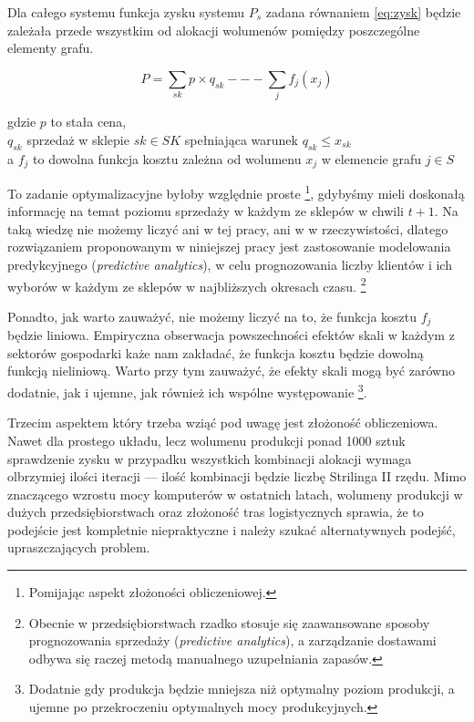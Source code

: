 \documentclass[polish, twoside, 12pt, a4paper]{article}
\theoremstyle{definition}
\theoremstyle{plain}
\theoremstyle{remark}
\begin{document}
Dla całego systemu funkcja zysku systemu $P_s$ zadana równaniem \ref{eq:zysk} będzie zależała przede wszystkim od alokacji wolumenów pomiędzy poszczególne elementy grafu.

\begin{equation} \label{eq:zysk}
P = \sum\limits_{sk} p \times q_{sk} --- \sum\limits_{j} f_j(x_j)
\end{equation}

\begin{center} gdzie $p$ to stała cena, \\ $q_{sk}$  sprzedaż w sklepie $sk \in SK$ spełniająca warunek $q_{sk} \le x_{sk}$ \\ a $f_j$ to dowolna funkcja kosztu zależna od wolumenu $x_j$ w elemencie grafu $j \in S$ \end{center}

To zadanie optymalizacyjne byłoby względnie proste \footnote{Pomijając aspekt złożoności obliczeniowej.}, gdybyśmy mieli doskonałą informację na temat poziomu sprzedaży w każdym ze sklepów w chwili $ t + 1 $. Na taką wiedzę nie możemy liczyć ani w tej pracy, ani w w rzeczywistości, dlatego rozwiązaniem proponowanym w niniejszej pracy jest zastosowanie modelowania predykcyjnego (\textit{predictive analytics}), w celu prognozowania liczby klientów i ich wyborów w każdym ze sklepów w najbliższych okresach czasu. \footnote{Obecnie w przedsiębiorstwach rzadko stosuje się zaawansowane sposoby prognozowania sprzedaży (\textit{predictive analytics}), a zarządzanie dostawami odbywa się raczej metodą manualnego uzupełniania zapasów.} 

Ponadto, jak warto zauważyć, nie możemy liczyć na to, że funkcja kosztu $f_j$ będzie liniowa. Empiryczna obserwacja powszechności efektów skali w każdym z sektorów gospodarki każe nam zakładać, że funkcja kosztu będzie dowolną funkcją nieliniową. Warto przy tym zauważyć, że efekty skali mogą być zarówno dodatnie, jak i ujemne, jak również ich wspólne występowanie \footnote{Dodatnie gdy produkcja będzie mniejsza niż optymalny poziom produkcji, a ujemne po przekroczeniu optymalnych mocy produkcyjnych.}.

Trzecim aspektem który trzeba wziąć pod uwagę jest złożoność obliczeniowa. Nawet dla prostego układu, lecz wolumenu produkcji ponad 1000 sztuk sprawdzenie zysku w przypadku wszystkich kombinacji alokacji wymaga olbrzymiej ilości iteracji --- ilość kombinacji będzie liczbę Strilinga II rzędu. Mimo znaczącego wzrostu mocy komputerów w ostatnich latach, wolumeny produkcji w dużych przedsiębiorstwach oraz złożoność tras logistycznych sprawia, że to podejście jest kompletnie niepraktyczne i należy szukać alternatywnych podejść, upraszczających problem.
\end{document}
